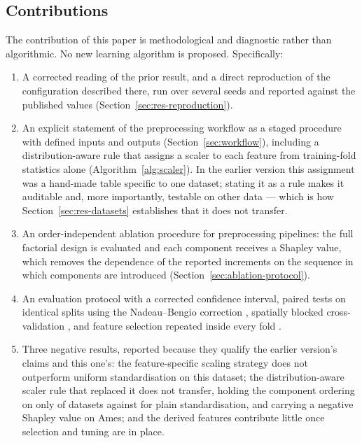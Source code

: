 \documentclass[pdflatex,sn-mathphys-num]{sn-jnl}
\begin{document}
\subsection{Contributions}\label{sec:contributions}
The contribution of this paper is methodological and diagnostic rather than algorithmic. No new learning algorithm is proposed. Specifically:

\begin{enumerate}
\item A corrected reading of the prior result, and a direct reproduction of the configuration described there, run over several seeds and reported against the published values (Section~\ref{sec:res-reproduction}).
\item An explicit statement of the preprocessing workflow as a staged procedure with defined inputs and outputs (Section~\ref{sec:workflow}), including a distribution-aware rule that assigns a scaler to each feature from training-fold statistics alone (Algorithm~\ref{alg:scaler}). In the earlier version this assignment was a hand-made table specific to one dataset; stating it as a rule makes it auditable and, more importantly, testable on other data --- which is how Section~\ref{sec:res-datasets} establishes that it does not transfer.
\item An order-independent ablation procedure for preprocessing pipelines: the full factorial design is evaluated and each component receives a Shapley value, which removes the dependence of the reported increments on the sequence in which components are introduced (Section~\ref{sec:ablation-protocol}).
\item An evaluation protocol with a corrected confidence interval, paired tests on identical splits using the Nadeau--Bengio correction \cite{nadeau2003}, spatially blocked cross-validation \cite{roberts2017}, and feature selection repeated inside every fold \cite{varma2006,ambroise2002}.
\item Three negative results, reported because they qualify the earlier version's claims and this one's: the feature-specific scaling strategy does not outperform uniform standardisation on this dataset; the distribution-aware scaler rule that replaced it does not transfer, holding the component ordering on only \NOrderHoldsAuto{} of \NDatasets{} datasets against \NOrderHoldsUni{} for plain standardisation, and carrying a negative Shapley value on Ames; and the derived features contribute little once selection and tuning are in place.
\end{enumerate}
\end{document}
